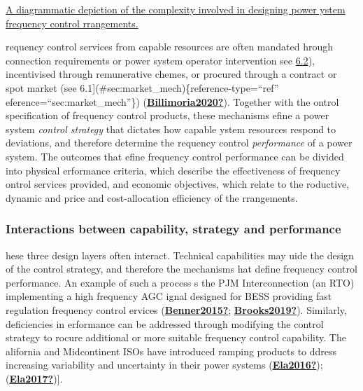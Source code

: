\documentclass[12pt,a4paper,]{report}
\begin{document}
\protect\hypertarget{fig:design_complexity}{\href{source/figures/capability_performance-04.png}{A
diagrammatic depiction of the complexity involved in designing power
ystem frequency control rrangements.}}

requency control services from capable resources are often mandated
hrough connection requirements or power system operator intervention see
\protect\hyperlink{sec:regulatory_mech}{6.2}), incentivised through
remunerative chemes, or procured through a contract or spot market (see
6.1{]}(\#sec:market\_mech)\{reference-type=``ref''
eference=``sec:market\_mech''\})
(\protect\hyperlink{ref-Billimoria2020}{\textbf{Billimoria2020?}}).
Together with the ontrol specification of frequency control products,
these mechanisms efine a power system \emph{control strategy} that
dictates how capable ystem resources respond to deviations, and
therefore determine the requency control \emph{performance} of a power
system. The outcomes that efine frequency control performance can be
divided into physical erformance criteria, which describe the
effectiveness of frequency ontrol services provided, and economic
objectives, which relate to the roductive, dynamic and price and
cost-allocation efficiency of the rrangements.

\hypertarget{interactions-between-capability-strategy-and-performance}{%
\subsubsection{Interactions between capability, strategy and
performance}\label{interactions-between-capability-strategy-and-performance}}

hese three design layers often interact. Technical capabilities may uide
the design of the control strategy, and therefore the mechanisms hat
define frequency control performance. An example of such a process s the
PJM Interconnection (an RTO) implementing a high frequency AGC ignal
designed for BESS providing fast regulation frequency control ervices
(\protect\hyperlink{ref-Benner2015}{\textbf{Benner2015?}};
\protect\hyperlink{ref-Brooks2019}{\textbf{Brooks2019?}}). Similarly,
deficiencies in erformance can be addressed through modifying the
control strategy to rocure additional or more suitable frequency control
capability. The alifornia and Midcontinent ISOs have introduced ramping
products to ddress increasing variability and uncertainty in their power
systems (\protect\hyperlink{ref-Ela2016}{\textbf{Ela2016?}});
(\protect\hyperlink{ref-Ela2017}{\textbf{Ela2017?}}){]}.
\end{document}
